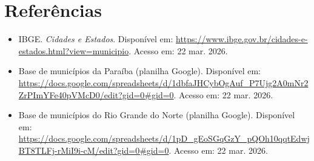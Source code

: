 \documentclass[10pt, a4paper, twocolumn]{article}
\begin{document}
\section{Referências}
\begin{itemize}
    \item IBGE. \textit{Cidades e Estados}. Disponível em: \url{https://www.ibge.gov.br/cidades-e-estados.html?view=municipio}. Acesso em: 22 mar. 2026.
    \item Base de municípios da Paraíba (planilha Google). Disponível em: \url{https://docs.google.com/spreadsheets/d/1dbfaJHCybOgAuf_P7Ujg2A0mNr2ZrPImYFe40pVMcD0/edit?gid=0#gid=0}. Acesso em: 22 mar. 2026.
    \item Base de municípios do Rio Grande do Norte (planilha Google). Disponível em: \url{https://docs.google.com/spreadsheets/d/1pD_gEoSGqGzY_pQOh10qqtEdwjBT8TLFj-rMiI9i-cM/edit?gid=0#gid=0}. Acesso em: 22 mar. 2026.
\end{itemize}
\end{document}
